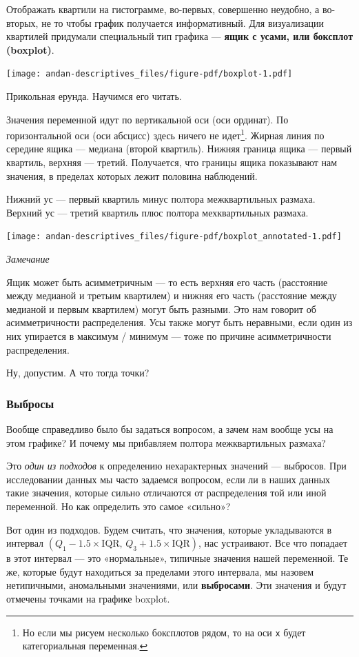\documentclass[
  letterpaper,
]{scrbook}
\theoremstyle{definition}
\theoremstyle{remark}
\begin{document}
Отображать квартили на гистограмме, во-первых, совершенно неудобно, а
во-вторых, не то чтобы график получается информативный. Для визуализации
квартилей придумали специальный тип графика --- \textbf{ящик с усами,
или боксплот (boxplot)}.

\texttt{[image: andan-descriptives\_files/figure-pdf/boxplot-1.pdf]}

Прикольная ерунда. Научимся его читать.

Значения переменной идут по вертикальной оси (оси ординат). По
горизонтальной оси (оси абсцисс) здесь ничего не идет\footnote{Но если
  мы рисуем несколько боксплотов рядом, то на оси \texttt{x} будет
  категориальная переменная.}. Жирная линия по середине ящика ---
медиана (второй квартиль). Нижняя граница ящика --- первый квартиль,
верхняя --- третий. Получается, что границы ящика показывают нам
значения, в пределах которых лежит половина наблюдений.

Нижний ус --- первый квартиль минус полтора межквартильных размаха.
Верхний ус --- третий квартиль плюс полтора мехквартильных размаха.

\texttt{[image: andan-descriptives\_files/figure-pdf/boxplot\_annotated-1.pdf]}

\emph{Замечание}

Ящик может быть асимметричным --- то есть верхняя его часть (расстояние
между медианой и третьим квартилем) и нижняя его часть (расстояние между
медианой и первым квартилем) могут быть разными. Это нам говорит об
асимметричности распределения. Усы также могут быть неравными, если один
из них упирается в максимум / минимум --- тоже по причине
асимметричности распределения.

Ну, допустим. А что тогда точки?

\subsubsection{Выбросы}\label{andan-descriptives-XX-iqr_outliers}

Вообще справедливо было бы задаться вопросом, а зачем нам вообще усы на
этом графике? И почему мы прибавляем полтора межквартильных размаха?

Это \emph{один из подходов} к определению нехарактерных значений ---
выбросов. При исследовании данных мы часто задаемся вопросом, если ли в
наших данных такие значения, которые сильно отличаются от распределения
той или иной переменной. Но как определить это самое «сильно»?

Вот один из подходов. Будем считать, что значения, которые укладываются
в интервал
\((Q_1 - 1.5 \times \mathrm{IQR}, \, Q_3 + 1.5 \times \mathrm{IQR})\),
нас устраивают. Все что попадает в этот интервал --- это «нормальные»,
типичные значения нашей переменной. Те же, которые будут находиться за
пределами этого интервала, мы назовем нетипичными, аномальными
значениями, или \textbf{выбросами}. Эти значения и будут отмечены
точками на графике boxplot.
\end{document}
